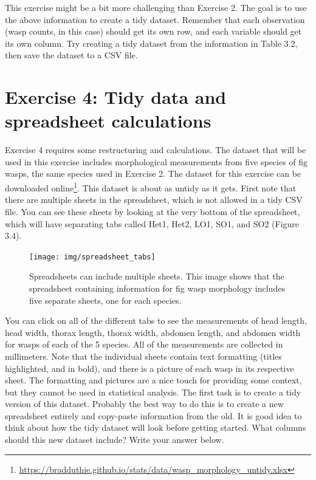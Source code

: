 \documentclass[
  openany]{krantz}
\begin{document}
This exercise might be a bit more challenging than Exercise 2.
The goal is to use the above information to create a tidy dataset.
Remember that each observation (wasp counts, in this case) should get its own row, and each variable should get its own column.
Try creating a tidy dataset from the information in Table 3.2, then save the dataset to a CSV file.

\hypertarget{exercise-4-tidy-data-and-spreadsheet-calculations}{%
\section{Exercise 4: Tidy data and spreadsheet calculations}\label{exercise-4-tidy-data-and-spreadsheet-calculations}}

Exercise 4 requires some restructuring and calculations.
The dataset that will be used in this exercise includes morphological measurements from five species of fig wasps, the same species used in Exercise 2.
The dataset for this exercise can be downloaded online\footnote{\url{https://bradduthie.github.io/stats/data/wasp_morphology_untidy.xlsx}}.
This dataset is about as untidy as it gets.
First note that there are multiple sheets in the spreadsheet, which is not allowed in a tidy CSV file.
You can see these sheets by looking at the very bottom of the spreadsheet, which will have separating tabs called Het1, Het2, LO1, SO1, and SO2 (Figure 3.4).

\begin{figure}
\texttt{[image: img/spreadsheet\_tabs]} \caption{Spreadsheets can include multiple sheets. This image shows that the spreadsheet containing information for fig wasp morphology includes five separate sheets, one for each species.}\label{fig:unnamed-chunk-19}
\end{figure}

You can click on all of the different tabs to see the measurements of head length, head width, thorax length, thorax width, abdomen length, and abdomen width for wasps of each of the 5 species.
All of the measurements are collected in millimeters.
Note that the individual sheets contain text formatting (titles highlighted, and in bold), and there is a picture of each wasp in its respective sheet.
The formatting and pictures are a nice touch for providing some context, but they cannot be used in statistical analysis.
The first task is to create a tidy version of this dataset.
Probably the best way to do this is to create a new spreadsheet entirely and copy-paste information from the old.
It is good idea to think about how the tidy dataset will look before getting started.
What columns should this new dataset include? Write your answer below.
\end{document}
